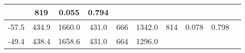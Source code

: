 \documentclass[a4paper,10pt]{article}
\begin{document}
\begin{longtable}{
     |
%    
    c|
%    
    c|
%    
    c|
%    
    c|
%    
    c|
%    
    c|
%    
    c|
%    
    c|
%    
    c|
%    
    c|
%    
    }
%        
        & 819
%        

%        

%        
        & 0.055
%        

%        

%        
        & 0.794
%        

%        
        \\
        \hline

        

%        

%        
        -57.5
%        

%        

%        
        & 434.9
%        

%        

%        
        & 1660.0
%        

%        

%        
        & 431.0
%        

%        

%        
        & 666
%        

%        

%        
        & 1342.0
%        

%        

%        
        & 814
%        

%        

%        
        & 0.078
%        

%        

%        
        & 0.798
%        

%        
        \\
        \hline

        

%        

%        
        -49.4
%        

%        

%        
        & 438.4
%        

%        

%        
        & 1658.6
%        

%        

%        
        & 431.0
%        

%        

%        
        & 664
%        

%        

%        
        & 1296.0
%        

%        


\end{longtable}
\end{document}
